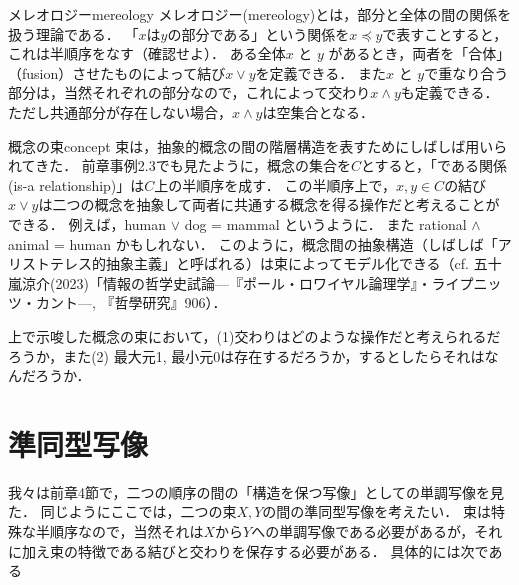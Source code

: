 \documentclass[11pt,a4paper, dvipdfmx]{jsarticle}
\begin{document}
\begin{rei}{メレオロジー}{mereology}
メレオロジー(mereology)とは，部分と全体の間の関係を扱う理論である．
「$x$は$y$の部分である」という関係を$x \preceq y$で表すことすると，これは半順序をなす（確認せよ）．
ある全体$x$ と $y$ があるとき，両者を「合体」（fusion）させたものによって結び$x \vee y$を定義できる．
また$x$ と $y$で重なり合う部分は，当然それぞれの部分なので，これによって交わり$x \wedge y$も定義できる．ただし共通部分が存在しない場合，$x \wedge y$は空集合となる．
\end{rei}

\begin{rei}{概念の束}{concept}
束は，抽象的概念の間の階層構造を表すためにしばしば用いられてきた．
前章事例2.3でも見たように，概念の集合を$C$とすると，「である関係(is-a relationship)」は$C$上の半順序を成す．
この半順序上で，$x, y \in C$の結び$x \vee y$は二つの概念を抽象して両者に共通する概念を得る操作だと考えることができる．
例えば，human $\vee$ dog = mammal というように．
また rational $\wedge$ animal = human かもしれない．
このように，概念間の抽象構造（しばしば「アリストテレス的抽象主義」と呼ばれる）は束によってモデル化できる（cf. 五十嵐涼介(2023)「情報の哲学史試論---『ポール・ロワイヤル論理学』・ライプニッツ・カント---, 『哲學研究』906）．
\end{rei}

\begin{renshu}{}{}
上で示唆した概念の束において，(1)交わりはどのような操作だと考えられるだろうか，また(2) 最大元1, 最小元0は存在するだろうか，するとしたらそれはなんだろうか．
\end{renshu}



\section{準同型写像}
我々は前章4節で，二つの順序の間の「構造を保つ写像」としての単調写像を見た．
同じようにここでは，二つの束$X, Y$の間の準同型写像を考えたい．
束は特殊な半順序なので，当然それは$X$から$Y$への単調写像である必要があるが，それに加え束の特徴である結びと交わりを保存する必要がある．
具体的には次である
\end{document}

